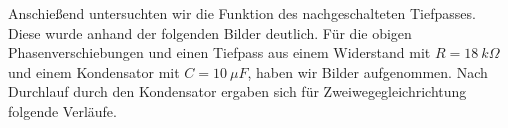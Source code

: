 \documentclass{scrartcl}						%
\begin{document}
			Anschießend untersuchten wir die Funktion des nachgeschalteten Tiefpasses. Diese wurde anhand der folgenden Bilder deutlich. Für die obigen Phasenverschiebungen und einen Tiefpass aus einem Widerstand mit $ R=18\ k\Omega $ und einem Kondensator mit $ C=10 \ \mu F $, haben wir Bilder aufgenommen. Nach Durchlauf durch den Kondensator ergaben sich für Zweiwegegleichrichtung folgende Verläufe.
			 \begin{figure}[h!]
			 \centering
			 \end{figure}
\end{document}
